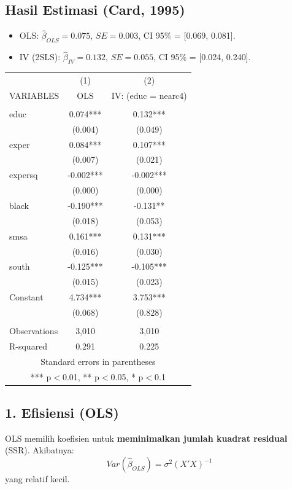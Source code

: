 \documentclass[]{article}
\begin{document}
\subsection*{Hasil Estimasi (Card, 1995)}
\begin{itemize}
    \item OLS: $\hat{\beta}_{OLS} = 0.075$, $SE = 0.003$, CI 95\% = [0.069, 0.081].
    \item IV (2SLS): $\hat{\beta}_{IV} = 0.132$, $SE = 0.055$, CI 95\% = [0.024, 0.240].
\end{itemize}
\begin{tabular}{lcc} \hline
 & (1) & (2) \\
VARIABLES & OLS & IV: (educ = nearc4) \\ \hline
 &  &  \\
educ & 0.074*** & 0.132*** \\
 & (0.004) & (0.049) \\
exper & 0.084*** & 0.107*** \\
 & (0.007) & (0.021) \\
expersq & -0.002*** & -0.002*** \\
 & (0.000) & (0.000) \\
black & -0.190*** & -0.131** \\
 & (0.018) & (0.053) \\
smsa & 0.161*** & 0.131*** \\
 & (0.016) & (0.030) \\
south & -0.125*** & -0.105*** \\
 & (0.015) & (0.023) \\
Constant & 4.734*** & 3.753*** \\
 & (0.068) & (0.828) \\
 &  &  \\
Observations & 3,010 & 3,010 \\
 R-squared & 0.291 & 0.225 \\ \hline
\multicolumn{3}{c}{ Standard errors in parentheses} \\
\multicolumn{3}{c}{ *** p$<$0.01, ** p$<$0.05, * p$<$0.1} \\
\end{tabular}
\newpage
\subsection*{1. Efisiensi (OLS)}
OLS memilih koefisien untuk \textbf{meminimalkan jumlah kuadrat residual} (SSR).  
Akibatnya:
\[
Var(\hat{\beta}_{OLS}) = \sigma^2 (X'X)^{-1}
\]
yang relatif kecil.  
\end{document}
